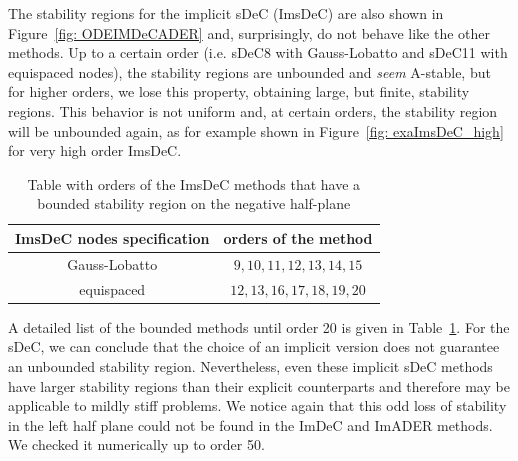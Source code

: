 The stability regions for the implicit sDeC (ImsDeC) are also shown in Figure~\ref{fig: ODEIMDeCADER} and, surprisingly, do not behave like the other methods. 
Up to a certain order (i.e. sDeC8 with Gauss-Lobatto and sDeC11 with equispaced nodes), the stability regions are unbounded and \textit{seem} A-stable, but for higher orders, we lose this property, obtaining large, but finite, stability regions. 
This behavior is not uniform and, at certain orders, the stability region will be unbounded again, as for example shown in Figure~\ref{fig: exaImsDeC_high} for very high order ImsDeC. 


\begin{table}
	\centering
	\caption{Table with orders of the ImsDeC methods that have a bounded stability region on the negative half-plane}
	\label{tab:imsDeC_bounded}
	\begin{tabular}[h]{|c|c|}
		\hline
		ImsDeC nodes specification & orders of the method\\
		\hline
		Gauss-Lobatto & $9, 10, 11, 12, 13, 14, 15 $\\
		\hline	equispaced & $12, 13, 16, 17, 18, 19, 20 $\\
		\hline
	\end{tabular}
\end{table}
A detailed list of the bounded methods until order 20 is given in Table~\ref{tab:imsDeC_bounded}. 
For the sDeC, we can conclude that the choice of an implicit version does not guarantee an unbounded stability region. Nevertheless, even these implicit sDeC methods have larger stability regions than their explicit counterparts and therefore may be applicable to mildly stiff problems. 
We notice again that this odd loss of stability in the left half plane could not be found in the ImDeC and ImADER methods. We checked it numerically up to order 50.




